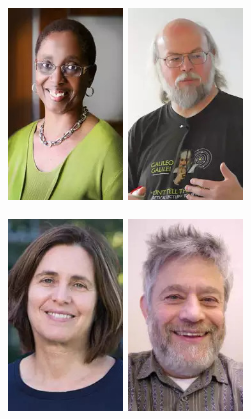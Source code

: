 \documentclass[xcolor={usenames,dvipsnames,svgnames,table},12pt]{beamer}
\begin{document}
\begin{frame}{}
  \begin{center}
    \includegraphics[height=2in]{valerie-taylor.jpg} \quad
    \includegraphics[height=2in]{james-gosling.jpg}
  \end{center}
\end{frame}

\begin{frame}{}
  \begin{center}
    \includegraphics[height=2in]{shafi-goldwasser.jpg} \quad
    \includegraphics[height=2in]{manuel-blum.jpg}
  \end{center}
\end{frame}
\end{document}
